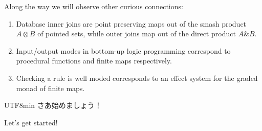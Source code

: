 \documentclass[runningheads]{llncs}
\newcommand\strong[1]{{\bfseries#1}}
\newcommand\todo[1]{{\color{IndianRed}#1}}
\newcommand\xxx{\text{\todo{\strong{XXX}}}}
\newcommand\todolater\todo
\renewcommand\todolater[1]{\todo{\color{RoyalBlue}#1}}
\renewcommand\todo[1]{\ignorespaces}\renewcommand\xxx{\text{\color{IndianRed}\strong{XXX}}}
\newcommand\<\:                 %
\newcommand\with{\mathbin{\&}}
\begin{document}



\noindent
Along the way we will observe other curious connections:
%
\begin{enumerate}
\item Database inner joins are point preserving maps out of the smash product $A \otimes B$ of pointed sets, while outer joins map out of the direct product $A \with B$.
\item Input/output modes in bottom-up logic programming correspond to procedural functions and finite maps respectively.
\item Checking a rule is well moded corresponds to an effect system for the graded monad of finite maps.
\end{enumerate}

\begin{center}
\noindent\begin{CJK*}{UTF8}{min}
さあ始めましょう！ %
\end{CJK*}
\qquad
Let's get started!
\end{center}
\end{document}
